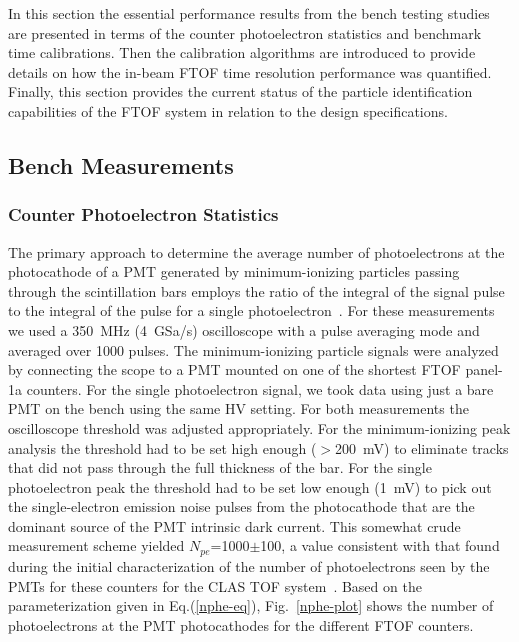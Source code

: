 \documentclass[3p,times,twocolumn]{elsarticle}
\begin{document}
In this section the essential performance results from the bench testing studies are presented in terms
of the counter photoelectron statistics and benchmark time calibrations. Then the calibration algorithms
are introduced to provide details on how the in-beam FTOF time resolution performance was quantified.
Finally, this section provides the current status of the particle identification capabilities of the FTOF
system in relation to the design specifications.

\subsection{Bench Measurements}

\subsubsection{Counter Photoelectron Statistics}
\label{sec:npe}

The primary approach to determine the average number of photoelectrons at the photocathode of a PMT
generated by minimum-ionizing particles passing through the scintillation bars employs the ratio of the
integral of the signal pulse to the integral of the pulse for a single photoelectron~\cite{Gi86}. For these
measurements we used a 350~MHz (4~GSa/s) oscilloscope with a pulse averaging mode and averaged over
1000 pulses. The minimum-ionizing particle signals were analyzed by connecting the scope to a PMT mounted
on one of the shortest FTOF panel-1a counters. For the single photoelectron signal, we took data using just a
bare PMT on the bench using the same HV setting. For both measurements the oscilloscope threshold was
adjusted appropriately. For the minimum-ionizing peak analysis the threshold had to be set high enough
($>$200~mV) to eliminate tracks that did not pass through the full thickness of the bar. For the single
photoelectron peak the threshold had to be set low enough (1~mV) to pick out the single-electron emission
noise pulses from the photocathode that are the dominant source of the PMT intrinsic dark current. This
somewhat crude measurement scheme yielded $N_{pe}$=1000$\pm$100, a value consistent with that found
during the initial characterization of the number of photoelectrons seen by the PMTs for these counters for
the CLAS TOF system~\cite{tof-nim}. Based on the parameterization given in Eq.(\ref{nphe-eq}),
Fig.~\ref{nphe-plot} shows the number of photoelectrons at the PMT photocathodes for the different FTOF
counters.
\end{document}
